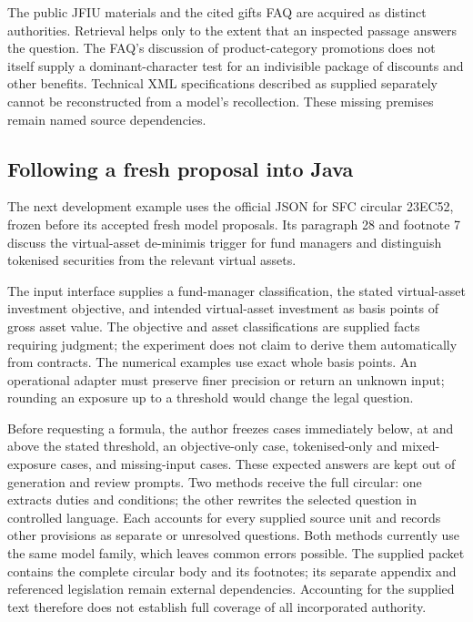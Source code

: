 \documentclass[12pt,a4paper,oneside,openany]{book}
\begin{document}
The public JFIU materials and the cited gifts FAQ are acquired as distinct
authorities. Retrieval helps only to the extent that an inspected passage
answers the question. The FAQ's discussion of product-category promotions does
not itself supply a dominant-character test for an indivisible package of
discounts and other benefits. Technical XML specifications described as supplied
separately cannot be reconstructed from a model's recollection. These missing
premises remain named source dependencies.~\cite{jfiu2026transition,sfcgiftfaq}

\subsection{Following a fresh proposal into Java}

The next development example uses the official JSON for SFC circular 23EC52,
frozen before its accepted fresh model proposals. Its paragraph 28 and footnote
7 discuss the virtual-asset de-minimis trigger for fund managers and distinguish
tokenised securities from the relevant virtual assets.~\cite{sfctokenised2023}

The input interface supplies a
fund-manager classification, the stated virtual-asset investment objective,
and intended virtual-asset investment as basis points of gross asset value.
The objective and asset classifications are supplied facts requiring judgment;
the experiment does not claim to derive them automatically from contracts.
The numerical examples use exact whole basis points. An operational adapter
must preserve finer precision or return an unknown input; rounding an exposure
up to a threshold would change the legal question.

Before requesting a formula, the author freezes cases immediately below, at
and above the stated threshold, an objective-only case, tokenised-only and
mixed-exposure cases, and missing-input cases. These expected answers are kept
out of generation and review prompts. Two methods receive the full circular:
one extracts duties and conditions; the other rewrites the selected question
in controlled language. Each accounts for every supplied source unit and
records other provisions as separate or unresolved questions. Both methods
currently use the same model family, which leaves common errors possible.
The supplied packet contains the complete circular body and its footnotes;
its separate appendix and referenced legislation remain external dependencies.
Accounting for the supplied text therefore does not establish full coverage
of all incorporated authority.
\end{document}
